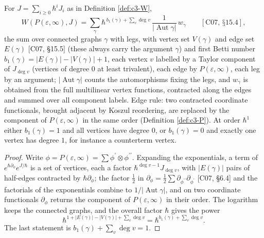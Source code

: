 \begin{proposition}
\label{prop:c3-graphs}
For $J=\sum_{i\ge0}\hbar^iJ_i$ as in Definition \ref{def:c3-W},
\[
W(P(\varepsilon,\infty),J)=\sum_\gamma\hbar^{\,b_1(\gamma)+\sum_v\deg v}\,\frac{1}{|\operatorname{Aut}\gamma|}\,w_\gamma\qquad[\text{C07, §15.4}],
\]
the sum over connected graphs $\gamma$ with legs, with vertex set $V(\gamma)$ and edge set $E(\gamma)$ [C07, §15.5] (these always carry the argument $\gamma$) and first Betti number $b_1(\gamma)=|E(\gamma)|-|V(\gamma)|+1$, each vertex $v$ labelled by a Taylor component of $J_{\deg v}$ (vertices of degree $0$ at least trivalent), each edge by $P(\varepsilon,\infty)$, each leg by an argument; $|\operatorname{Aut}\gamma|$ counts the automorphisms fixing the legs, and $w_\gamma$ is obtained from the full multilinear vertex functions, contracted along the edges and summed over all component labels. Edge rule: two contracted coordinate functionals, brought adjacent by Koszul reordering, are replaced by the component of $P(\varepsilon,\infty)$ in the same order (Definition \ref{def:c3-P}). At order $\hbar^1$ either $b_1(\gamma)=1$ and all vertices have degree $0$, or $b_1(\gamma)=0$ and exactly one vertex has degree $1$, for instance a counterterm vertex.
\end{proposition}

\begin{proof}
Write $\phi=P(\varepsilon,\infty)=\sum\phi^{\prime}\otimes\phi^{\prime\prime}$. Expanding the exponentials, a term of $e^{\hbar\partial_\phi}e^{J/\hbar}$ is a set of vertices, each a factor $\hbar^{\deg v-1}J_{\deg v}$, with $|E(\gamma)|$ pairs of half-edges contracted by $\hbar\partial_\phi$; the factor $\frac12$ in $\partial_\phi=\frac12\sum\partial_{\phi^{\prime\prime}}\partial_{\phi^{\prime}}$ [C07, §6.4] and the factorials of the exponentials combine to $1/|\operatorname{Aut}\gamma|$, and on two coordinate functionals $\partial_\phi$ returns the component of $P(\varepsilon,\infty)$ in their order. The logarithm keeps the connected graphs, and the overall factor $\hbar$ gives the power
\[
\hbar^{1+|E(\gamma)|-|V(\gamma)|+\sum_v\deg v}=\hbar^{b_1(\gamma)+\sum_v\deg v}.
\]
The last statement is $b_1(\gamma)+\sum_v\deg v=1$.
\end{proof}

